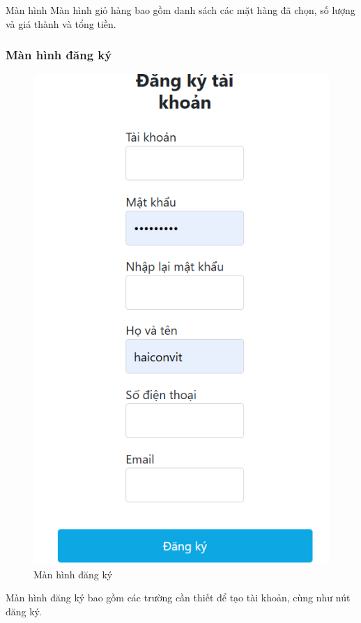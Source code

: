 \documentclass[../DoAn.tex]{subfiles}
\begin{document}
Màn hình Màn hình giỏ hàng bao gồm danh sách các mặt hàng đã chọn, số lượng và giá thành và tổng tiền.

\subsubsection{Màn hình đăng ký}
\begin{figure}[H]
    \centering
    \includegraphics[width=0.8\linewidth]{Hinhve/đăng kí.png}
    \caption{Màn hình đăng ký}
    \label{fig:visual sign up}
\end{figure}

Màn hình đăng ký bao gồm các trường cần thiết để tạo tài khoản, cùng như nút đăng ký.
\end{document}
